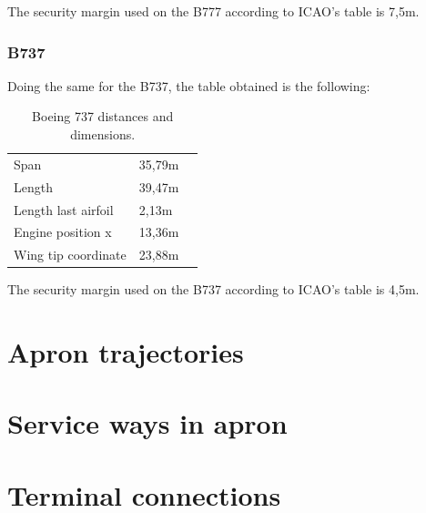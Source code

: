 		The security margin used on the B777 according to ICAO's table is 7,5m.
		
		\subsubsection{B737}
		Doing the same for the B737, the table obtained is the following:
		
		\begin{table}[htb]
			\centering
			\begin{tabular}{ll p{5cm}}
				\midrule[2pt]
				Span & 35,79m\\
				Length & 39,47m\\
				Length last airfoil& 2,13m \\
				Engine position x & 13,36m\\
				Wing tip coordinate & 23,88m\\
				\bottomrule[2pt]
			\end{tabular}
			\caption{Boeing 737 distances and dimensions.}
			\label{Boeing737distances}
		\end{table}
		
		The security margin used on the B737 according to ICAO's table is 4,5m.
			
	\section{Apron trajectories}
	
	
	\section{Service ways in apron}
	
	
	\section{Terminal connections}
	